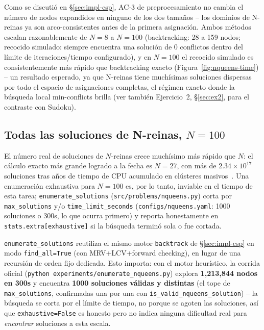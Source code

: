 \documentclass[11pt,onecolumn,letterpaper]{article}
\newcommand{\code}[1]{\texttt{#1}}
\begin{document}
Como se discuti\'o en \S\ref{sec:impl-csp}, AC-3 de preprocesamiento no cambia el n\'umero
de nodos expandidos en ninguno de los dos tama\~nos -- los dominios de N-reinas ya son
arco-consistentes antes de la primera asignaci\'on. Ambos m\'etodos escalan razonablemente
de $N=8$ a $N=100$ (backtracking: 28 a 159 nodos; recocido simulado: siempre encuentra una
soluci\'on de 0 conflictos dentro del l\'imite de iteraciones/tiempo configurado), y en
$N=100$ el recocido simulado es consistentemente m\'as r\'apido que backtracking exacto
(Figura~\ref{fig:nqueens-time}) -- un resultado esperado, ya que N-reinas tiene
much\'isimas soluciones dispersas por todo el espacio de asignaciones completas, el
r\'egimen exacto donde la b\'usqueda local min-conflicts brilla (ver tambi\'en
Ejercicio~2, \S\ref{sec:ex2}, para el contraste con Sudoku).

\subsection{Todas las soluciones de N-reinas, $N=100$}
\label{sec:app-enum}

El n\'umero real de soluciones de $N$-reinas crece much\'isimo m\'as r\'apido que $N$: el
c\'alculo exacto m\'as grande logrado a la fecha es $N=27$, con m\'as de
$2.34\times10^{17}$ soluciones tras a\~nos de tiempo de CPU acumulado en cl\'usteres
masivos~\cite{oeis000170}. Una enumeraci\'on exhaustiva para $N=100$ es, por lo tanto,
inviable en el tiempo de esta tarea; \code{enumerate\_solutions}
(\code{src/problems/nqueens.py}) corta por \code{max\_solutions} y/o
\code{time\_limit\_seconds} (\code{configs/nqueens.yaml}: 1000 soluciones o 300s, lo que
ocurra primero) y reporta honestamente en \code{stats.extra[\textquotedbl exhaustive\textquotedbl]} si la b\'usqueda
termin\'o sola o fue cortada.

\code{enumerate\_solutions} reutiliza el mismo motor \code{backtrack} de
\S\ref{sec:impl-csp} en modo \code{find\_all=True} (con MRV+LCV+forward checking), en
lugar de una recursi\'on de orden fijo dedicada. Esto importa: con el motor heur\'istico,
la corrida oficial (\code{python experiments/enumerate\_nqueens.py}) explora
\textbf{1{,}213{,}844 nodos en 300s} y encuentra \textbf{1000 soluciones v\'alidas y
distintas} (el tope de \code{max\_solutions}, confirmadas una por una con
\code{is\_valid\_nqueens\_solution}) -- la b\'usqueda se corta por el l\'imite de tiempo, no
porque se agoten las soluciones, as\'i que \code{exhaustive=False} es honesto pero no
indica ninguna dificultad real para \emph{encontrar} soluciones a esta escala.
\end{document}

